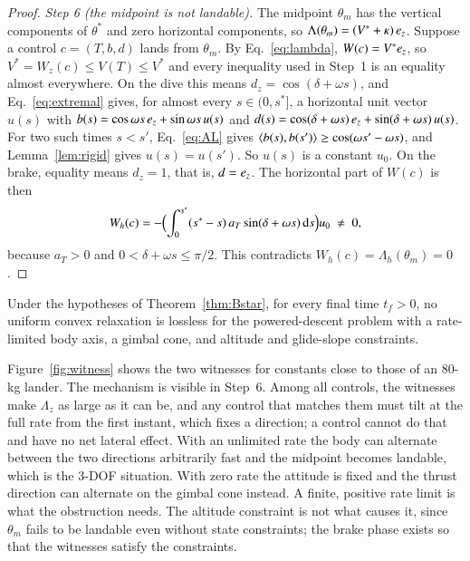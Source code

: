 \begin{proof}
\emph{Step 6 (the midpoint is not landable).} The midpoint $\theta_m$ has the vertical components of $\theta^*$ and zero
horizontal components, so $\Lambda(\theta_m)=(V^*+\kappa)\,e_z$. Suppose a control $c=(T,b,d)$ lands from $\theta_m$. By
Eq.~\eqref{eq:lambda}, $W(c)=V^*e_z$, so $V^*=W_z(c)\le V(T)\le V^*$ and every inequality used in Step~1 is an equality
almost everywhere. On the dive this means $d_z=\cos(\delta+\omega s)$, and Eq.~\eqref{eq:extremal} gives, for almost every
$s\in(0,s^*]$, a horizontal unit vector $u(s)$ with $b(s)=\cos\omega s\,e_z+\sin\omega s\,u(s)$ and
$d(s)=\cos(\delta+\omega s)\,e_z+\sin(\delta+\omega s)\,u(s)$. For two such times $s<s'$, Eq.~\eqref{eq:AL} gives
$\langle b(s),b(s')\rangle\ge\cos(\omega s'-\omega s)$, and Lemma~\ref{lem:rigid} gives $u(s)=u(s')$. So $u(s)$ is a constant $u_0$.
On the brake, equality means $d_z=1$, that is, $d=e_z$. The horizontal part of $W(c)$ is then
\begin{equation}
W_h(c)=-\Bigl(\int_0^{s^*}(s^*-s)\,a_T\sin(\delta+\omega s)\,\mathrm ds\Bigr)u_0\ \ne\ 0 ,
\end{equation}
because $a_T>0$ and $0<\delta+\omega s\le\pi/2$. This contradicts $W_h(c)=\Lambda_h(\theta_m)=0$.
\end{proof}

\begin{corollary}\label{cor:main}
Under the hypotheses of Theorem~\ref{thm:Bstar}, for every final time $t_f>0$, no uniform convex relaxation is lossless for
the powered-descent problem with a rate-limited body axis, a gimbal cone, and altitude and glide-slope constraints.
\end{corollary}

Figure~\ref{fig:witness} shows the two witnesses for constants close to those of an 80-kg lander. The mechanism is visible
in Step~6. Among all controls, the witnesses make $\Lambda_z$ as large as it can be, and any control that matches them must
tilt at the full rate from the first instant, which fixes a direction; a control cannot do that and have no net lateral
effect. With an unlimited rate the body can alternate between the two directions arbitrarily fast and the midpoint becomes
landable, which is the 3-DOF situation. With zero rate the attitude is fixed and the thrust direction can alternate on the
gimbal cone instead. A finite, positive rate limit is what the obstruction needs. The altitude constraint is not what
causes it, since $\theta_m$ fails to be landable even without state constraints; the brake phase exists so that the witnesses
satisfy the constraints.


